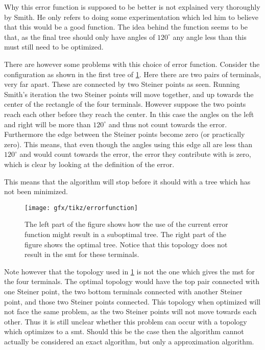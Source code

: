 Why this error function is supposed to be better is not explained very
thoroughly by Smith. He only refers to doing some experimentation which led him
to believe that this would be a good function. The idea behind the function
seems to be that, as the final tree should only have angles of $120^{\circ}$ any
angle less than this must still need to be optimized.

There are however some problems with this choice of error function. Consider
the configuration as shown in the first tree of \cref{fig:error-function}. Here
there are two pairs of terminals, very far apart. These are connected by two
Steiner points as seen. Running Smith's iteration the two Steiner points will
move together, and up towards the center of the rectangle of the four
terminals. However suppose the two points reach each other before they reach
the center. In this case the angles on the left and right will be more than
$120^{\circ}$ and thus not count towards the error. Furthermore the edge
between the Steiner points become zero (or practically zero). This means, that
even though the angles using this edge all are less than $120^{\circ}$ and would
count towards the error, the error they contribute with is zero, which is clear
by looking at the definition of the error.

This means that the algorithm will stop before it should with a tree which has
not been minimized.

\begin{figure}[htbp]
  \centering
  \texttt{[image: gfx/tikz/errorfunction]}
  \caption[Possible problem with the error function]{The left part of the figure
    shows how the use of the current error function might result in a suboptimal
    tree. The right part of the figure shows the optimal tree. Notice that
    this topology does not result in the \gls{smt} for these
    terminals.\label{fig:error-function}}
\end{figure}

Note however that the topology used in \cref{fig:error-function} is not the
one which gives the \gls{mst} for the four terminals. The optimal topology
would have the top pair connected with one Steiner point, the two bottom
terminals connected with another Steiner point, and those two Steiner points
connected. This topology when optimized will not face the same problem, as the
two Steiner points will not move towards each other. Thus it is still unclear
whether this problem can occur with a topology which optimizes to a \gls{smt}.
Should this be the case then the algorithm cannot actually be considered an
exact algorithm, but only a approximation algorithm.

